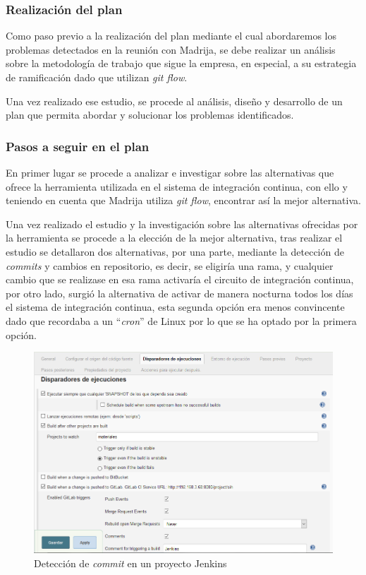 \subsubsection{Realización del plan}

Como paso previo a la realización del plan mediante el cual abordaremos los problemas detectados en la reunión con Madrija, se debe realizar un análisis sobre la metodología de trabajo que sigue la empresa, en especial, a su estrategia de ramificación dado que utilizan \textit{git flow}.

Una vez realizado ese estudio, se procede al análisis, diseño y desarrollo de un plan que permita abordar y solucionar los problemas identificados.

\subsubsection{Pasos a seguir en el plan}

En primer lugar se procede a analizar e investigar sobre las alternativas que ofrece la herramienta utilizada en el sistema de integración continua, con ello y teniendo en cuenta que \ac{Madrija} utiliza \textit{git flow}, encontrar así la mejor alternativa.

\clearpage

Una vez realizado el estudio y la investigación sobre las alternativas ofrecidas por la herramienta se procede a la elección de la mejor alternativa, tras realizar el estudio se detallaron dos alternativas, por una parte, mediante la detección de \textit{commits} y cambios en repositorio, es decir, se eligiría una rama, y cualquier cambio que se realizase en esa rama activaría el circuito de integración continua, por otro lado, surgió la alternativa de activar de manera nocturna todos los días el sistema de integración continua, esta segunda opción era menos convincente dado que recordaba a un ``\textit{cron}'' de Linux por lo que se ha optado por la primera opción.

\begin{figure}[!h]
\centering
   \includegraphics[width=13cm]{JenkinsSIH_Disparadores.PNG}
\caption{Detección de \textit{commit} en un proyecto Jenkins}
\end{figure}

